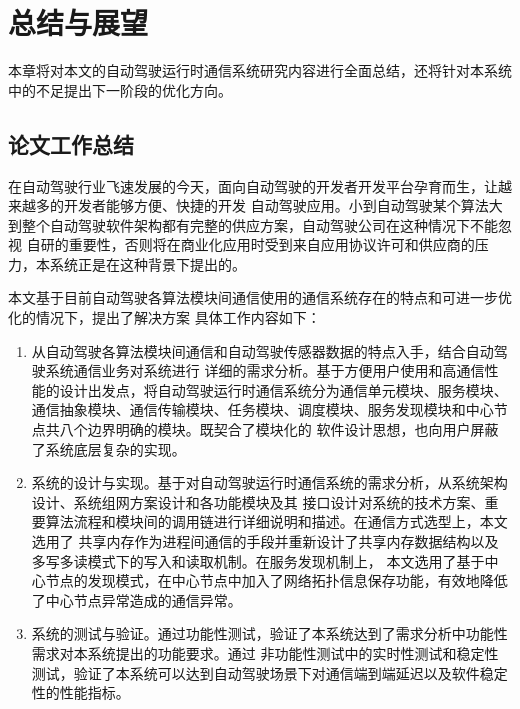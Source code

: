 \chapter{总结与展望}
本章将对本文的自动驾驶运行时通信系统研究内容进行全面总结，还将针对本系统中的不足提出下一阶段的优化方向。
\section{论文工作总结}
在自动驾驶行业飞速发展的今天，面向自动驾驶的开发者开发平台孕育而生，让越来越多的开发者能够方便、快捷的开发
自动驾驶应用。小到自动驾驶某个算法大到整个自动驾驶软件架构都有完整的供应方案，自动驾驶公司在这种情况下不能忽视
自研的重要性，否则将在商业化应用时受到来自应用协议许可和供应商的压力，本系统正是在这种背景下提出的。

本文基于目前自动驾驶各算法模块间通信使用的通信系统存在的特点和可进一步优化的情况下，提出了解决方案
具体工作内容如下：
\begin{enumerate}
    \item 从自动驾驶各算法模块间通信和自动驾驶传感器数据的特点入手，结合自动驾驶系统通信业务对系统进行
    详细的需求分析。基于方便用户使用和高通信性能的设计出发点，将自动驾驶运行时通信系统分为通信单元模块、服务模块、
    通信抽象模块、通信传输模块、任务模块、调度模块、服务发现模块和中心节点共八个边界明确的模块。既契合了模块化的
    软件设计思想，也向用户屏蔽了系统底层复杂的实现。
    \item 系统的设计与实现。基于对自动驾驶运行时通信系统的需求分析，从系统架构设计、系统组网方案设计和各功能模块及其
    接口设计对系统的技术方案、重要算法流程和模块间的调用链进行详细说明和描述。在通信方式选型上，本文选用了
    共享内存作为进程间通信的手段并重新设计了共享内存数据结构以及多写多读模式下的写入和读取机制。在服务发现机制上，
    本文选用了基于中心节点的发现模式，在中心节点中加入了网络拓扑信息保存功能，有效地降低了中心节点异常造成的通信异常。
    \item 系统的测试与验证。通过功能性测试，验证了本系统达到了需求分析中功能性需求对本系统提出的功能要求。通过
    非功能性测试中的实时性测试和稳定性测试，验证了本系统可以达到自动驾驶场景下对通信端到端延迟以及软件稳定性的性能指标。
\end{enumerate}


